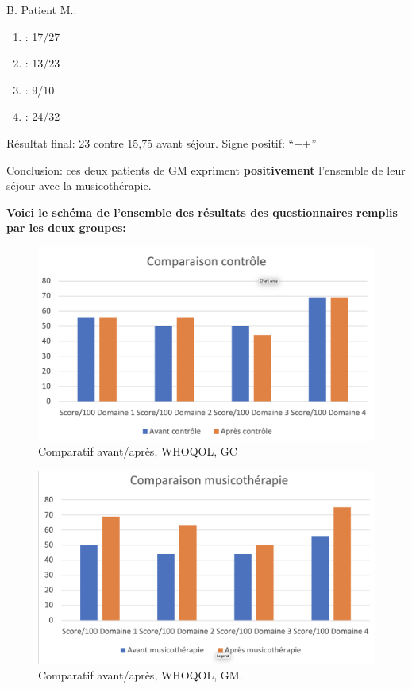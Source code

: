 \begin{enumerate}
        
        B. Patient M.:
	\begin{enumerate}
 		\item : 17/27 
 		\item : 13/23
 		\item : 9/10
 		\item : 24/32
                \end{enumerate}
                 Résultat final: 23 contre 15,75 avant séjour. Signe positif:  ``++''

                 Conclusion: ces deux patients de GM expriment
                 \textbf{positivement }
                 l'ensemble de leur séjour avec la musicothérapie.

               \textbf{  Voici le schéma de l'ensemble des résultats des
                 questionnaires remplis par les deux groupes:}
                
\begin{figure}
\centering
\includegraphics[width=0.7\linewidth]{images/Compcontrole.png}
\caption[Schéma du déroulement]{Comparatif avant/après, 
  WHOQOL, GC}
       
\label{groupecontroleimage1}
\end{figure}

\begin{figure}
\centering
\includegraphics[width=0.7\linewidth]{images/Compmusico.png}
\caption[Schéma du déroulement]{Comparatif  avant/après, WHOQOL, GM.}
       

\end{figure}
\end{enumerate}
